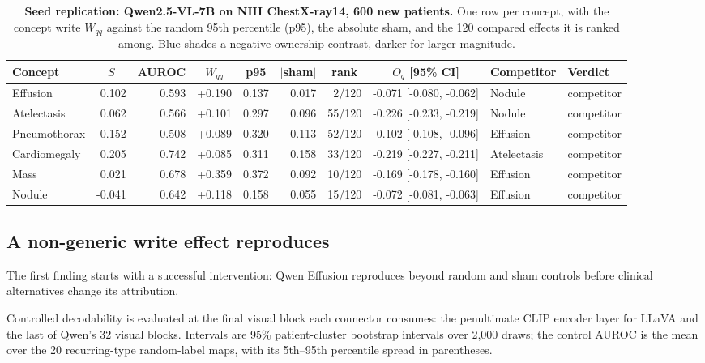 \documentclass{article}
\begin{document}
\begin{table}[t]
\centering
\scriptsize
\setlength{\tabcolsep}{4pt}

\caption{\textbf{Seed replication: Qwen2.5-VL-7B on NIH ChestX-ray14, 600 new patients.} One row per concept, with the concept write $W_{qq}$ against the random 95th percentile (p95), the absolute sham, and the 120 compared effects it is ranked among. Blue shades a negative ownership contrast, darker for larger magnitude.}
\label{tab:cf-seed}
\begin{tabular}{lrrrrrrrll}
\toprule
Concept & \multicolumn{1}{c}{$S$} & \multicolumn{1}{c}{AUROC} & \multicolumn{1}{c}{$W_{qq}$} & \multicolumn{1}{c}{p95} & \multicolumn{1}{c}{$|$sham$|$} & \multicolumn{1}{c}{rank} & \multicolumn{1}{c}{$O_q$ [95\% CI]} & Competitor & Verdict\\
\midrule
Effusion & 0.102 & 0.593 & +0.190 & 0.137 & 0.017 & 2/120 & \cellcolor{cfSlate2}-0.071 [-0.080, -0.062] & Nodule & competitor \\
Atelectasis & 0.062 & 0.566 & +0.101 & 0.297 & 0.096 & 55/120 & \cellcolor{cfSlate3}-0.226 [-0.233, -0.219] & Nodule & competitor \\
Pneumothorax & 0.152 & 0.508 & +0.089 & 0.320 & 0.113 & 52/120 & \cellcolor{cfSlate3}-0.102 [-0.108, -0.096] & Effusion & competitor \\
Cardiomegaly & 0.205 & 0.742 & +0.085 & 0.311 & 0.158 & 33/120 & \cellcolor{cfSlate3}-0.219 [-0.227, -0.211] & Atelectasis & competitor \\
Mass & 0.021 & 0.678 & +0.359 & 0.372 & 0.092 & 10/120 & \cellcolor{cfSlate3}-0.169 [-0.178, -0.160] & Effusion & competitor \\
Nodule & -0.041 & 0.642 & +0.118 & 0.158 & 0.055 & 15/120 & \cellcolor{cfSlate2}-0.072 [-0.081, -0.063] & Effusion & competitor \\
\bottomrule
\end{tabular}
\end{table}

\subsection{A non-generic write effect reproduces}
\label{sec:qwen-replication}

The first finding starts with a successful intervention: Qwen Effusion reproduces beyond random and sham controls before clinical alternatives change its attribution.

Controlled decodability is evaluated at the final visual block each connector consumes: the penultimate CLIP encoder layer for LLaVA and the last of Qwen's 32 visual blocks. Intervals are 95\% patient-cluster bootstrap intervals over 2,000 draws; the control AUROC is the mean over the 20 recurring-type random-label maps, with its 5th--95th percentile spread in parentheses.
\end{document}
